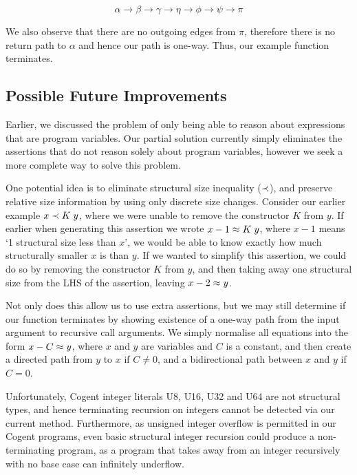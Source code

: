 \[
    \alpha \rightarrow \beta \rightarrow \gamma \rightarrow
    \eta   \rightarrow \phi  \rightarrow \psi   \rightarrow
    \pi
\]

We also observe that there are no outgoing edges from $\pi$, therefore there is no return path
to $\alpha$ and hence our path is one-way. Thus, our example function terminates.

\subsection{Possible Future Improvements}

Earlier, we discussed the problem of only being able to reason about expressions that are
program variables. Our partial solution currently simply eliminates the assertions that
do not reason solely about program variables, however we seek a more complete way to solve
this problem.

One potential idea is to eliminate structural size inequality ($\prec$), and preserve relative
size information by using only discrete size changes. Consider our earlier example $x \prec K\; y$,
where we were unable to remove the constructor $K$ from $y$. 
If earlier when generating this assertion we wrote  $x - 1 \approx K\; y$,
where $x - 1$ means `1 structural size less than $x$', we would be able to know exactly
how much structurally smaller $x$ is than $y$. If we wanted to simplify this assertion,
we could do so by removing the constructor $K$ from $y$, and then taking away one structural size from
the LHS of the assertion, leaving $x - 2 \approx y$.

Not only does this allow us to use extra assertions, but we may still determine 
if our function terminates by showing existence of a one-way path from the input
argument to recursive call arguments. We simply normalise all equations into the
form $x - C \approx y$, where $x$ and $y$ are variables and $C$ is a constant, and
then create a directed path from $y$ to $x$ if $C \neq 0$, and a bidirectional
path between $x$ and $y$ if $C = 0$.

Unfortunately, Cogent integer literals \textsf{U8}, \textsf{U16}, \textsf{U32} and
\textsf{U64} are not structural types, and hence terminating recursion on integers
cannot be detected via our current method. Furthermore, as unsigned integer
overflow is permitted in our Cogent programs, even basic structural integer
recursion could produce a non-terminating program, as a program that takes
away from an integer recursively with no base case can infinitely underflow.

